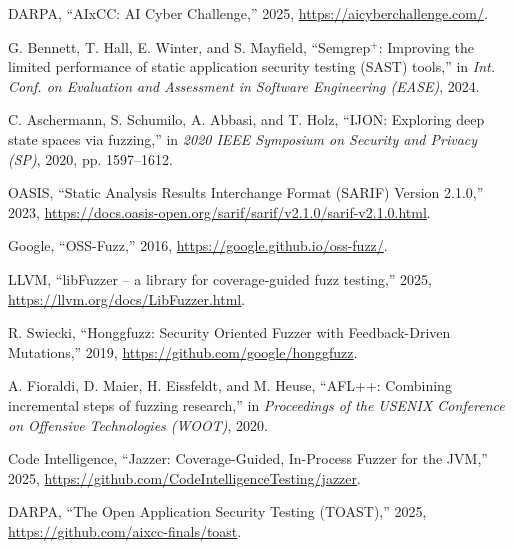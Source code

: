 %


DARPA, ``AIxCC: AI Cyber Challenge,'' 2025, \url{https://aicyberchallenge.com/}.

G. Bennett, T. Hall, E. Winter, and S. Mayfield, ``Semgrep$^+$: Improving the limited performance of static application security testing (SAST) tools,'' in \textit{Int. Conf. on Evaluation and Assessment in Software Engineering (EASE)}, 2024.

C. Aschermann, S. Schumilo, A. Abbasi, and T. Holz, ``IJON: Exploring deep state spaces via fuzzing,'' in \textit{2020 IEEE Symposium on Security and Privacy (SP)}, 2020, pp. 1597--1612.


OASIS, ``Static Analysis Results Interchange Format (SARIF) Version 2.1.0,'' 2023, \url{https://docs.oasis-open.org/sarif/sarif/v2.1.0/sarif-v2.1.0.html}.

Google, ``OSS-Fuzz,'' 2016, \url{https://google.github.io/oss-fuzz/}.

LLVM, ``libFuzzer -- a library for coverage-guided fuzz testing,'' 2025, \url{https://llvm.org/docs/LibFuzzer.html}.

R. Swiecki, ``Honggfuzz: Security Oriented Fuzzer with Feedback-Driven Mutations,'' 2019, \url{https://github.com/google/honggfuzz}.

A. Fioraldi, D. Maier, H. Eissfeldt, and M. Heuse, ``AFL++: Combining incremental steps of fuzzing research,'' in \textit{Proceedings of the USENIX Conference on Offensive Technologies (WOOT)}, 2020.

Code Intelligence, ``Jazzer: Coverage-Guided, In-Process Fuzzer for the JVM,'' 2025, \url{https://github.com/CodeIntelligenceTesting/jazzer}.

DARPA, ``The Open Application Security Testing (TOAST),'' 2025, \url{https://github.com/aixcc-finals/toast}.

